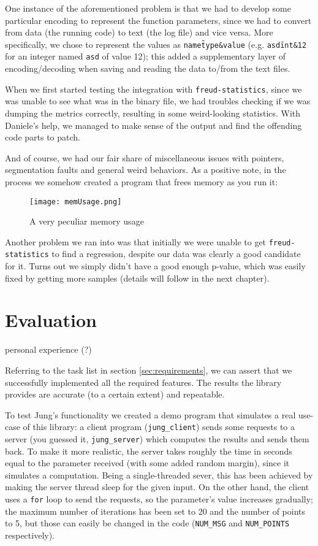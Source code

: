 \documentclass[11pt,english,singlespacing,headsepline,consistentlayout]{auxiliary/si-msc-thesis}
\begin{document}
        One instance of the aforementioned problem is that we had to
develop some particular encoding to represent the function
parameters, since we had to convert from data (the running code) to
text (the log file) and vice versa. More specifically, we chose to
represent the values as \texttt{name\=type\&value}
(e.g. \texttt{asd\=int\&12} for an integer named \texttt{asd} of value
12); this added a supplementary layer of encoding/decoding when saving
and reading the data to/from the text files.

        When we first started testing the integration with
\texttt{freud-statistics}, since we was unable to see what was in the
binary file, we had troubles checking if we was dumping the metrics
correctly, resulting in some weird-looking statistics. With Daniele's
help, we managed to make sense of the output and find the offending
code parts to patch.

        And of course, we had our fair share of miscellaneous issues
with pointers, segmentation faults and general weird behaviors. As a
positive note, in the process we somehow created a program that frees
memory as you run it:

        \begin{figure}[H] \centering \texttt{[image: memUsage.png]}
            \caption{A very peculiar memory usage}
            \label{fig:memUsage}
        \end{figure}

        Another problem we ran into was that initially we were unable
to get \texttt{freud-statistics} to find a regression, despite our
data was clearly a good candidate for it. Turns out we simply didn't
have a good enough p-value, which was easily fixed by getting more
samples (details will follow in the next chapter).


\chapter{Evaluation}

personal experience (?)

    Referring to the task list in section \ref{sec:requirements}, we
can assert that we successfully implemented all the required
features. The results the library provides are accurate (to a certain
extent) and repeatable.

    To test Jung's functionality we created a demo program that
simulates a real use-case of this library: a client program
(\texttt{jung\_client}) sends some requests to a server (you guessed
it, \texttt{jung\_server}) which computes the results and sends them
back. To make it more realistic, the server takes roughly the time in
seconds equal to the parameter received (with some added random
margin), since it simulates a computation. Being a single-threaded
sever, this has been achieved by making the server thread sleep for
the given input. On the other hand, the client uses a \texttt{for}
loop to send the requests, so the parameter's value increases
gradually; the maximum number of iterations has been set to 20 and the
number of points to 5, but those can easily be changed in the code
(\texttt{NUM\_MSG} and \texttt{NUM\_POINTS} respectively).
\end{document}
